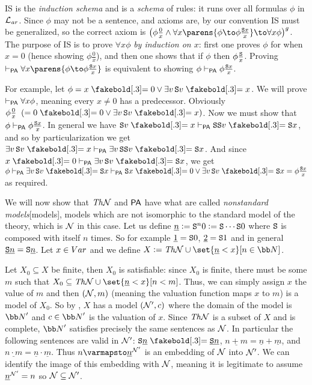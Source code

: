 IS is the {\it induction schema} and is a {\it schema} of rules: it runs over all formulas $\phi$ in ${\cal L}_{\it ar}$.
Since $\phi$ may not be a sentence, and axioms are, by our convention IS must be generalized, so the correct axiom is
$\bigl(\phi\frac 0x\land\forall x\parens{\phi\to\phi\frac{{\tt S}x}x}\to\forall x\phi\bigr)^g$.
The purpose of IS is to prove $\forall x\phi$ {\it by induction on $x$}: first one proves $\phi$ for when $x=0$ (hence showing $\phi\frac 0x$), and then one shows that if $\phi$ then $\phi\frac{{\tt S}}x$.
Proving $\vdash_{\sf PA}\forall x\parens{\phi\to\phi\frac{{\tt S}x}x}$ is equivalent to showing $\phi\vdash_{\sf PA}\phi\frac{{\tt S}x}x$.

For example, let $\phi=x\eq0\lor\exists v\,{\tt S}v\eq x$.
We will prove $\vdash_{\sf PA}\forall x\phi$, meaning every $x\neq0$ has a predecessor.
Obviously $\phi\frac0x\mathrel{}(=0\eq0\lor\exists v\,{\tt S}v\eq x)$.
Now we must show that $\phi\vdash_{\sf PA}\phi\frac{{\tt S}x}x$.
In general we have ${\tt S}v\eq x\vdash_{\sf PA}{\tt SS}v\eq{\tt S}x$, and so by particularization we get $\exists v\,{\tt S}v\eq x\vdash_{\sf PA}\exists v\,{\tt SS}v\eq{\tt S}x$.
And since $x\eq0\vdash_{\sf PA}\exists v\,{\tt S}v\eq{\tt S}x$, we get $\phi\vdash_{\sf PA}\exists v\,{\tt S}v\eq{\tt S}x\vdash_{\sf PA}{\tt S}x\eq0\lor\exists v\,{\tt S}v\eq{\tt S}x=\phi\frac{{\tt S}x}x$ as
required.

We will now show that $\Th{\cal N}$ and ${\sf PA}$ have what are called {\it nonstandard models}[models], models which are not isomorphic to the standard model of the theory, which
is ${\cal N}$ in this case.
Let us define $\underline n\coloneqq{\tt S}^n0\coloneqq{\tt S}\cdots{\tt S}0$ where ${\tt S}$ is composed with itself $n$ times.
So for example $\underline1={\tt S}0$, $\underline2={\tt S}1$ and in general $\underline{{\tt S}n}={\tt S}\underline n$.
Let $x\in\Var$ and we define $X\coloneqq\Th{\cal N}\cup\set{\underline n<x}[n\in{\bb N}]$.

Let $X_0\subseteq X$ be finite, then $X_0$ is satisfiable: since $X_0$ is finite, there must be some $m$ such that $X_0\subseteq\Th{\cal N}\cup\set{\underline n<x}[n<m]$.
Thus, we can simply assign $x$ the value of $m$ and then $({\cal N},m)$ (meaning the valuation function maps $x$ to $m$) is a model of $X_0$.
So by , $X$ has a model $({\cal N}',c)$ where the domain of the model is ${\bb N}'$ and $c\in{\bb N}'$ is the valuation of $x$.
Since $\Th{\cal N}$ is a subset of $X$ and is complete, ${\bb N}'$ satisfies precisely the same sentences as ${\cal N}$.
In particular the following sentences are valid in ${\cal N}'$: ${\tt S}\underline n\eq\underline{{\tt S}n}$, $\underline{n+m}=\underline n+\underline m$, and
$\underline{n\cdot m}=\underline n\cdot\underline m$.
Thus $n\varmapsto\underline n^{\cal N'}$ is an embedding of ${\cal N}$ into ${\cal N}'$.
We can identify the image of this embedding with ${\cal N}$, meaning it is legitimate to assume $\underline n^{\cal N'}=n$ so ${\cal N}\subseteq{\cal N}'$.

